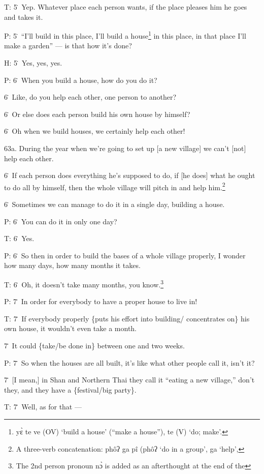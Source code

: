 T: 5\. Yep. Whatever place each person wants, if the place pleases him he goes
and takes it.

P: 5\. ``I'll build in this place, I'll build a house\footnote{yɛ̀ te ve (OV) `build a house' (``make a house''), te (V) `do; make'.} in this place, in that
place I'll make a garden'' --- is that how it's done?

H: 5\. Yes, yes, yes.

P: 6\. When you build a house, how do you do it?

6\. Like, do you help each other, one person to another?

6\. Or else does each person build his own house by himself?

6\. Oh when we build houses, we certainly help each other!

63a. During the year when we're going to set up [a new village] we can't [not]
help each other.

6\. If each person does everything he's supposed to do, if [he does] what he ought
to do all by himself, then the whole village will pitch in and help him.\footnote{A three-verb concatenation: phôʔ ga pî (phôʔ `do in a group', ga `help',}

6\. Sometimes we can manage to do it in a single day, building a house.

P: 6\. You can do it in only one day?

T: 6\. Yes.

P: 6\. So then in order to build the bases of a whole village properly, I wonder
how many days, how many months it takes.

T: 6\. Oh, it doesn't take many months, you know.\footnote{The 2nd person pronoun nɔ̀ is added as an afterthought at the end of the}

P: 7\. In order for everybody to have a proper house to live in!

T: 7\. If everybody properly \{puts his effort into building/ concentrates on\}
his own house, it wouldn't even take a month.

7\. It could \{take/be done in\} between one and two weeks.

P: 7\. So when the houses are all built, it's like what other people call it, isn't
it?

7\. [I mean,] in Shan and Northern Thai they call it ``eating a new village,''
don't they, and they have a \{festival/big party\}.

T: 7\. Well, as for that ---


